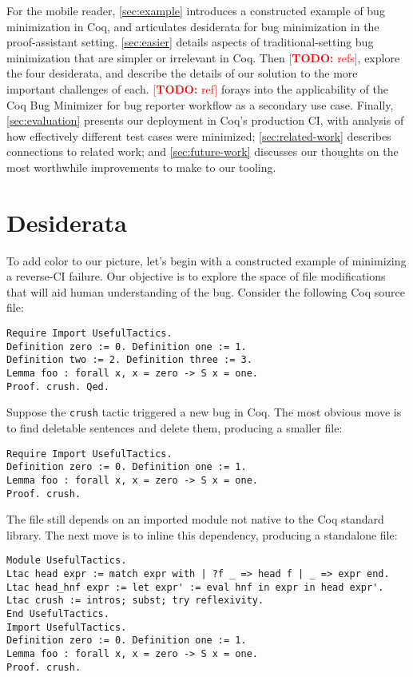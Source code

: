 \documentclass[a4paper,USenglish,cleveref,autoref,thm-restate]{lipics-v2021}
\makeatletter
\newcommand{\todo}[1]{%
\@latex@warning{TODO: \detokenize{#1} on page \thepage}%
\textcolor{red}{[\textbf{TODO:} #1]}}%
\makeatother
\begin{document}
For the mobile reader, \autoref{sec:example} introduces a constructed example of bug minimization in Coq, and articulates desiderata for bug minimization in the proof-assistant setting.
 \autoref{sec:easier} details aspects of traditional-setting bug minimization that are simpler or irrelevant in Coq.
Then \todo{refs}, explore the four desiderata, and describe the details of our solution to the more important challenges of each.
 \todo{ref} forays into the applicability of the Coq Bug Minimizer for bug reporter workflow as a secondary use case.
Finally, \autoref{sec:evaluation} presents our deployment in Coq's production CI, with analysis of how effectively different test cases were minimized; \autoref{sec:related-work} describes connections to related work; and \autoref{sec:future-work} discusses our thoughts on the most worthwhile improvements to make to our tooling.



\section{Desiderata}\label{sec:example}


To add color to our picture, let's begin with a constructed example of minimizing a reverse-CI failure.
Our objective is to explore the space of file modifications that will aid human understanding of the bug.
Consider the following Coq source file:
\begin{verbatim}
Require Import UsefulTactics.
Definition zero := 0. Definition one := 1.
Definition two := 2. Definition three := 3.
Lemma foo : forall x, x = zero -> S x = one.
Proof. crush. Qed.
\end{verbatim}

Suppose the \texttt{crush} tactic triggered a new bug in Coq.
The most obvious move is to find deletable sentences and delete them, producing a smaller file:
\begin{verbatim}
Require Import UsefulTactics.
Definition zero := 0. Definition one := 1.
Lemma foo : forall x, x = zero -> S x = one.
Proof. crush.
\end{verbatim}

The file still depends on an imported module not native to the Coq standard library.
The next move is to inline this dependency, producing a standalone file:
\begin{verbatim}
Module UsefulTactics.
Ltac head expr := match expr with | ?f _ => head f | _ => expr end.
Ltac head_hnf expr := let expr' := eval hnf in expr in head expr'.
Ltac crush := intros; subst; try reflexivity.
End UsefulTactics.
Import UsefulTactics.
Definition zero := 0. Definition one := 1.
Lemma foo : forall x, x = zero -> S x = one.
Proof. crush.
\end{verbatim}
\end{document}
